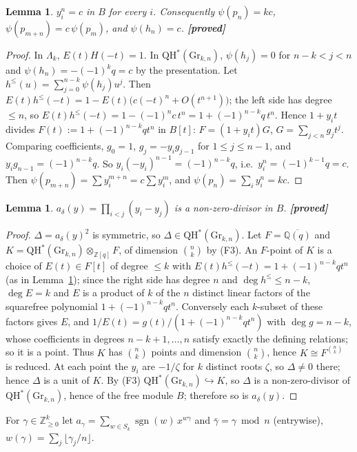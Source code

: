 \documentclass[11pt]{article}
\newtheorem{lemma}[theorem]{Lemma}
\theoremstyle{remark}
\newcommand{\QH}{\mathrm{QH}^*(\mathrm{Gr}_{k,n})}
\newcommand{\Z}{\mathbb{Z}}
\newcommand{\grade}[1]{\textbf{[#1]}}
\DeclareMathOperator{\sgn}{sgn}
\begin{document}
\begin{lemma}\label{lem:root}
$y_i^n=c$ in $B$ for every $i$. Consequently $\psi(p_n)=kc$, $\psi(p_{m+n})=c\,\psi(p_m)$, and $\psi(h_n)=c$.
\grade{proved}
\end{lemma}
\begin{proof}
In $\Lambda_k$, $E(t)H(-t)=1$. In $\QH$, $\psi(h_j)=0$ for $n-k<j<n$ and $\psi(h_n)=-(-1)^kq=c$ by the presentation.
Let $h^{\le}(u)=\sum_{j=0}^{n-k}\psi(h_j)u^j$. Then $E(t)h^{\le}(-t)=1-E(t)\bigl(c(-t)^n+O(t^{n+1})\bigr)$; the left side has
degree $\le n$, so $E(t)h^{\le}(-t)=1-(-1)^nc\,t^n=1+(-1)^{n-k}q\,t^n$. Hence $1+y_it$ divides $F(t):=1+(-1)^{n-k}qt^n$ in $B[t]$:
$F=(1+y_it)G$, $G=\sum_{j<n}g_jt^j$. Comparing coefficients, $g_0=1$, $g_j=-y_ig_{j-1}$ for $1\le j\le n-1$, and
$y_ig_{n-1}=(-1)^{n-k}q$. So $y_i(-y_i)^{n-1}=(-1)^{n-k}q$, i.e.\ $y_i^n=(-1)^{k-1}q=c$. Then
$\psi(p_{m+n})=\sum y_i^{m+n}=c\sum y_i^m$, and $\psi(p_n)=\sum_i y_i^n=kc$.
\end{proof}

\begin{lemma}\label{lem:nzd}
$a_\delta(y)=\prod_{i<j}(y_i-y_j)$ is a non-zero-divisor in $B$. \grade{proved}
\end{lemma}
\begin{proof}
$\Delta=a_\delta(y)^2$ is symmetric, so $\Delta\in\QH$. Let $F=\overline{\mathbb{Q}(q)}$ and $K=\QH\otimes_{\Z[q]}F$,
of dimension $\binom nk$ by (F3). An $F$-point of $K$ is a choice of $E(t)\in F[t]$ of degree $\le k$ with
$E(t)h^\le(-t)=1+(-1)^{n-k}qt^n$ (as in Lemma~\ref{lem:root}); since the right side has degree $n$ and $\deg h^\le\le n-k$,
$\deg E=k$ and $E$ is a product of $k$ of the $n$ distinct linear factors of the squarefree polynomial $1+(-1)^{n-k}qt^n$.
Conversely each $k$-subset of these factors gives $E$, and $1/E(t)=g(t)/(1+(-1)^{n-k}qt^n)$ with $\deg g=n-k$, whose
coefficients in degrees $n-k+1,\dots,n$ satisfy exactly the defining relations; so it is a point. Thus $K$ has
$\binom nk$ points and dimension $\binom nk$, hence $K\cong F^{\binom nk}$ is reduced. At each point the $y_i$ are $-1/\zeta$
for $k$ distinct roots $\zeta$, so $\Delta\neq0$ there; hence $\Delta$ is a unit of $K$. By (F3) $\QH\hookrightarrow K$,
so $\Delta$ is a non-zero-divisor of $\QH$, hence of the free module $B$; therefore so is $a_\delta(y)$.
\end{proof}

For $\gamma\in\Z_{\ge0}^k$ let $a_\gamma=\sum_{w\in S_k}\sgn(w)\,x^{w\gamma}$ and $\bar\gamma=\gamma\bmod n$
(entrywise), $w(\gamma)=\sum_j\lfloor\gamma_j/n\rfloor$.
\end{document}
